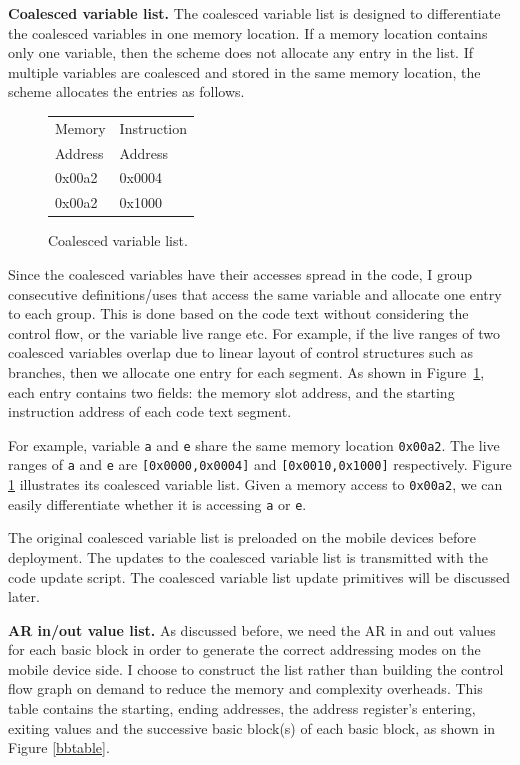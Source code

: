 {\bf Coalesced variable list.}
The coalesced variable list is designed to differentiate the coalesced variables in one memory location. If a memory location contains only one variable, then the scheme does not allocate any entry in the list. If multiple variables are coalesced and stored in the same memory location, the scheme allocates the entries as follows. 

\begin{figure}[htdp]
\begin{small}
\begin{center}
\begin{tabular}{p{1in} p{1in} }  \hline
Memory  & Instruction  \\
Address & Address \\ \hline\hline
0x00a2 & 0x0004  \\
0x00a2 & 0x1000  \\ \hline
\end{tabular}
\end{center}
\caption{Coalesced variable list.}
\label{memvar}
\end{small}
\end{figure}

Since the coalesced variables have their accesses spread in the code, I group consecutive definitions/uses that access the same variable and allocate one entry to each group. This is done based on the code text without considering the control flow, or the variable live range etc. For example, if the live ranges of two coalesced variables overlap due to linear layout of control structures such as branches, then we allocate one entry for each segment. As shown in Figure~\ref{memvar}, each entry contains two fields: the memory slot address, and the starting instruction address of each code text segment. 

For example, variable {\tt a} and {\tt e} share the same memory location {\tt 0x00a2}. The live ranges of {\tt a} and {\tt e} are {\tt [0x0000,0x0004]} and {\tt [0x0010,0x1000]} respectively. Figure \ref{memvar} illustrates its coalesced variable list. Given a memory access to {\tt 0x00a2}, we can easily differentiate whether it is accessing {\tt a} or {\tt e}.

The original coalesced variable list is preloaded on the mobile devices before deployment. The updates to the coalesced variable list is transmitted with the code update script. The coalesced variable list update primitives will be discussed later.

{\bf AR in/out value list.} 
As discussed before, we need the AR in and out values for each basic block in order to generate the correct addressing modes on the mobile device side. I choose to construct the list rather than building the control flow graph on demand to reduce the memory and complexity overheads. This table contains the starting, ending addresses, the address register's entering, exiting values and the successive basic block(s) of each basic block, as shown in Figure \ref{bbtable}.

